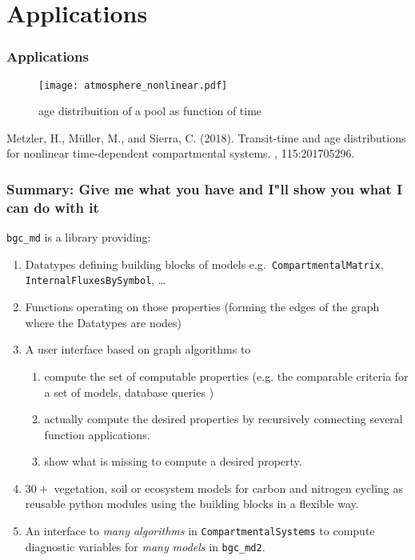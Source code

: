 \section{Applications}
\begin{frame}
	\frametitle{Applications}
	\begin{figure}
	\texttt{[image: atmosphere\_nonlinear.pdf]}
		\caption{age distribuition of a pool as function of time}
	\end{figure}
	\begin{thebibliography}{}
	Metzler, H., M{\"u}ller, M., and Sierra, C. (2018).
	\newblock Transit-time and age distributions for nonlinear time-dependent
	  compartmental systems.
	, 115:201705296.
	\end{thebibliography}
\end{frame}

\begin{frame}
\frametitle{Summary: Give me what you have and I"ll show you what I can do with it} 
  \texttt{bgc\_md} is a library providing:
  \begin{enumerate}
    \item
      Datatypes defining building blocks of models e.g.\ \texttt{CompartmentalMatrix}, \texttt{InternalFluxesBySymbol}, \dots     
    \item
      Functions operating on those properties (forming the edges of the graph where the Datatypes are nodes) 
    \item
      A user interface based on graph algorithms to  
    \begin{enumerate}
      \item
        compute the set of computable properties (e.g. the comparable criteria for a set of models, database queries ) 
      \item
        actually compute the desired properties by recursively connecting several function applications.
      \item
        show what is missing to compute a desired property.
    \end{enumerate}
    \item
    $30+$ vegetation, soil or ecosystem models for carbon and nitrogen cycling
      as reusable python modules using the building blocks in a flexible way. 
    \item 
      An interface to \emph{many  algorithms} in \texttt{CompartmentalSystems} to compute diagnostic variables
      for \emph{many models} in \texttt{bgc\_md2}.
  \end{enumerate}
\end{frame}

